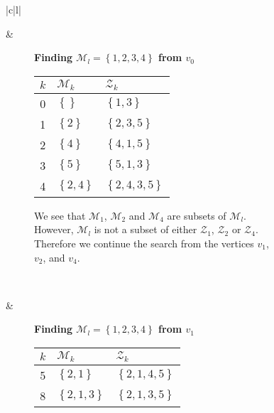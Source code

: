 \begin{figure}[H]
    \centering
    \begin{tabular}[t]{|c|l|}\hline
    \begin{subfigure}[b]{0.35\textwidth}
        \centering
        
    \end{subfigure}
    & 
    \begin{subfigure}[b]{0.64\textwidth}
        \textbf{Finding $\mathcal{M}_l = \left\{{1,2,3,4}\right\}$ from $v_0$} \\
        \begin{tabular}{rll}
            $k$ & $\mathcal{M}_k$            & $\mathcal{Z}_k$ \\ \hline
            0        & $\left\{{}\right\}$        & $\left\{{1,3}\right\}$ \\ 
            1        & $\left\{{2}\right\}$       & $\left\{{2,3,5}\right\}$ \\ 
            2        & $\left\{{4}\right\}$       & $\left\{{4,1,5}\right\}$ \\ 
            3        & $\left\{{5}\right\}$       & $\left\{{5,1,3}\right\}$ \\ 
            4        & $\left\{{2,4}\right\}$     & $\left\{{2,4,3,5}\right\}$ \\ 
        \end{tabular}

        We see that $\mathcal{M}_1$, $\mathcal{M}_2$ and $\mathcal{M}_4$ are
        subsets of $\mathcal{M}_l$. However, $\mathcal{M}_l$ is not a subset
        of either $\mathcal{Z}_1$, $\mathcal{Z}_2$ or $\mathcal{Z}_4$.
        Therefore we continue the search from the vertices $v_1$, $v_2$,
        and $v_4$.
    \end{subfigure}
    \\ \hline
    \begin{subfigure}[b]{0.35\textwidth}
        \centering
        
    \end{subfigure}
    & 
    \begin{subfigure}[b]{0.64\textwidth}
        \textbf{Finding $\mathcal{M}_l = \left\{{1,2,3,4}\right\}$ from $v_1$} \\
        \begin{tabular}{rll}
            $k$ & $\mathcal{M}_k$            & $\mathcal{Z}_k$ \\ \hline
            5        & $\left\{{2,1}\right\}$     & $\left\{{2,1,4,5}\right\}$ \\ 
            8        & $\left\{{2,1,3}\right\}$   & $\left\{{2,1,3,5}\right\}$ \\ 
        \end{tabular}


\end{subfigure}
\end{tabular}
\end{figure}
